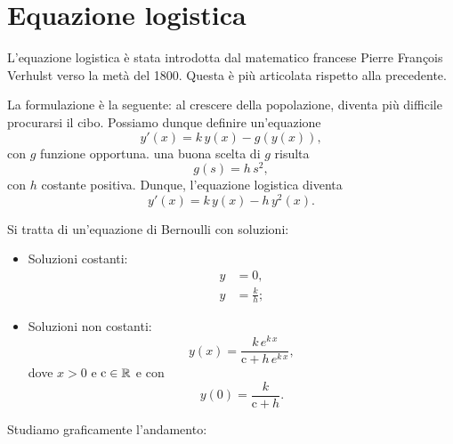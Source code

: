 \documentclass[../../analisi2]{subfiles}
\begin{document}
        \section{Equazione logistica}

            L'equazione logistica è stata introdotta dal matematico francese Pierre François Verhulst verso la metà del 1800. Questa è più
            articolata rispetto alla precedente.

            La formulazione è la seguente: al crescere della popolazione, diventa più difficile procurarsi il cibo. Possiamo dunque
            definire un'equazione
            \[
                y'(x) = k \, y(x) - g(y(x)),
            \]
            con \(g\) funzione opportuna. una buona scelta di \(g\) risulta
            \[
                g(s) = h \, s^2,
            \]
            con \(h\) costante positiva. Dunque, l'equazione logistica diventa
            \[
                y'(x) = k \, y(x) - h \, y^2(x).
            \]

            \newpage

            Si tratta di un'equazione di Bernoulli con soluzioni:
            \begin{itemize}
                \item Soluzioni costanti:
                    \begin{align*}
                        y &= 0,\\
                        y &= \frac{k}{h};
                    \end{align*}
                \item Soluzioni non costanti:
                    \[
                        y(x) = \frac{k \, e^{k \, x}}{\mathrm{c} + h \, e^{k \, x}},
                    \]
                    dove \(x > 0\) e \(\mathrm{c} \in \mathbb{R}\) e con
                    \[
                        y(0) = \frac{k}{\mathrm{c} + h}.
                    \]
            \end{itemize}

            Studiamo graficamente l'andamento:

            \medskip

            \begin{center}
                
            \end{center}
\end{document}
